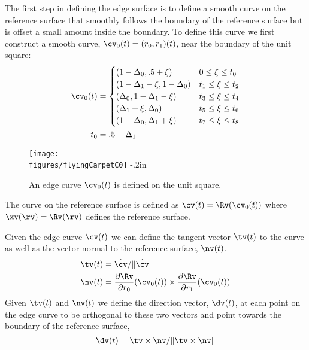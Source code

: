 The first step in defining the edge surface is to define a smooth curve on the reference surface that
smoothly follows the boundary of the reference surface but is offset a small amount inside the
boundary. To define this curve we first construct a smooth curve, $\cv_0(t) = (r_0,r_1)(t)$,
near the boundary of the unit square:
\begin{align*}
  \cv_0(t) &= 
     \begin{cases}
        (1-\Delta_0, .5+\xi)  &  0\le \xi \le t_0 \\
        (1-\Delta_1-\xi, 1-\Delta_0)  &  t_1 \le \xi \le t_2 \\
        (\Delta_0, 1-\Delta_1-\xi)  &  t_3 \le \xi \le t_4 \\
        (\Delta_1+\xi, \Delta_0)  &    t_5 \le \xi \le t_6 \\
        (1-\Delta_0, \Delta_1+\xi)  &  t_7\le \xi \le t_8 \\
     \end{cases}  \\
  t_0 & = .5-\Delta_1 
\end{align*}
\begin{figure}[h]
  \begin{center}
   \texttt{[image: \\figures/flyingCarpetC0]} 
   \vglue-.2in
  \caption{An edge curve $\cv_0(t)$ is defined on the unit square.}
  \end{center} 
\end{figure}



The curve on the reference surface is defined 
as $\cv(t) = \Rv(\cv_0(t))$ where $\xv(\rv)=\Rv(\rv)$ defines the reference surface.


Given the edge curve $\cv(t)$ we can define the tangent vector $\tv(t)$ to the curve as well
as the vector normal to the reference surface, $\nv(t)$.
\begin{align*}
  \tv(t) &= \dot{\cv} / \| \dot{\cv} \|  \\
  \nv(t) &= {\partial \Rv \over \partial r_0}(\cv_0(t)) \times {\partial \Rv \over  \partial r_1}(\cv_0(t))
\end{align*}
Given $\tv(t)$ and $\nv(t)$ we define the direction vector, $\dv(t)$, at each point on the
edge curve to be orthogonal to these two vectors and point towards the boundary of the
reference surface,
\[
  \dv(t) = \tv \times \nv / \| \tv \times \nv \|
\]


